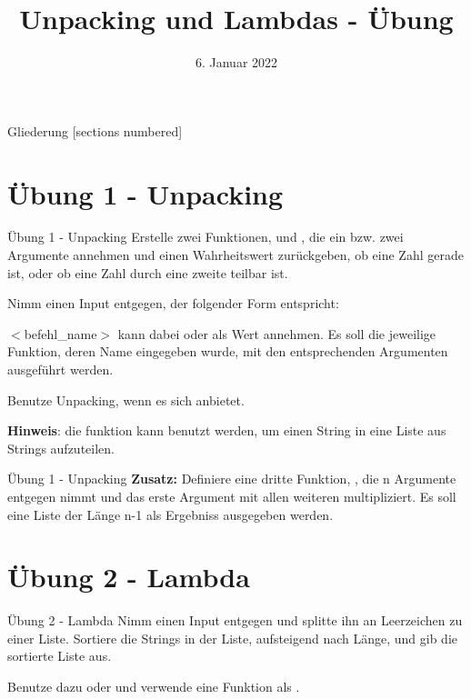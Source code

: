 



\title{Unpacking und Lambdas - Übung}
\date{6. Januar 2022}


\maketitle

\begin{frame}{Gliederung}
	[sections numbered]
	\tableofcontents
\end{frame}

\section{Übung 1 - Unpacking}
\begin{frame}{Übung 1 - Unpacking}
	Erstelle zwei Funktionen,  und , die ein bzw. zwei Argumente annehmen und einen Wahrheitswert zurückgeben, ob eine Zahl gerade ist, oder ob eine Zahl durch eine zweite teilbar ist.
	
	Nimm einen Input entgegen, der folgender Form entspricht:
	
	
	$<$befehl\_name$>$ kann dabei  oder  als Wert annehmen.
	Es soll die jeweilige Funktion, deren Name eingegeben wurde, mit den entsprechenden Argumenten ausgeführt werden.
	
	Benutze \alert{Unpacking}, wenn es sich anbietet.
	
	\textbf{Hinweis}: die  funktion kann benutzt werden, um einen String in eine Liste aus Strings aufzuteilen.
\end{frame}
\begin{frame}{Übung 1 - Unpacking}
	\textbf{Zusatz:}
	Definiere eine dritte Funktion, , die n Argumente entgegen nimmt und das erste Argument mit allen weiteren multipliziert. Es soll eine Liste der Länge n-1 als Ergebniss ausgegeben werden.
\end{frame}

\section{Übung 2 - Lambda}
\begin{frame}{Übung 2 - Lambda}
	Nimm einen Input entgegen und splitte ihn an Leerzeichen zu einer Liste. Sortiere die Strings in der Liste, aufsteigend nach Länge, und gib die sortierte Liste aus.

	Benutze dazu  oder  und verwende eine  Funktion als .
\end{frame}


